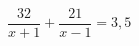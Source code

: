 \begin{ex}[type=equation]
	\begin{condition}
		$\dfrac{32}{x + 1} + \dfrac{21}{x- 1} = 3,5$
	\end{condition}
\end{ex}